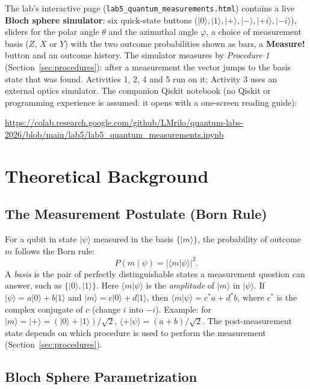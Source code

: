 \documentclass[a4paper,11pt]{article}
\providecommand{\ket}[1]{|{#1}\rangle}
\providecommand{\braket}[2]{\langle{#1}|{#2}\rangle}
\begin{document}
\begin{simulatorbox}
The lab's interactive page (\texttt{lab5\_quantum\_measurements.html}) contains a live
\textbf{Bloch sphere simulator}: six quick-state buttons ($\ket{0}, \ket{1}, \ket{+},
\ket{-}, \ket{+i}, \ket{-i}$), sliders for the polar angle $\theta$ and the azimuthal
angle $\varphi$, a choice of measurement basis ($Z$, $X$ or $Y$) with the two outcome
probabilities shown as bars, a \textbf{Measure!} button and an outcome history. The
simulator measures by \emph{Procedure 1} (Section~\ref{sec:procedures}): after a
measurement the vector jumps to the basis state that was found. Activities 1, 2, 4 and 5
run on it; Activity 3 uses an external optics simulator. The companion Qiskit notebook
(no Qiskit or programming experience is assumed: it opens with a one-screen reading
guide):\par\smallskip\noindent\url{https://colab.research.google.com/github/LMrilo/quantum-labs-2026/blob/main/lab5/lab5_quantum_measurements.ipynb}
\end{simulatorbox}

\section{Theoretical Background}

\subsection{The Measurement Postulate (Born Rule)}

For a qubit in state $\ket{\psi}$ measured in the basis $\{\ket{m}\}$, the probability
of outcome $m$ follows the Born rule:
\begin{equation}
    P(m \mid \psi) = |\braket{m}{\psi}|^2 .
    \label{eq:born}
\end{equation}
A \emph{basis} is the pair of perfectly distinguishable states a measurement question can
answer, such as $\{\ket{0}, \ket{1}\}$. Here $\braket{m}{\psi}$ is the \emph{amplitude}
of $\ket{m}$ in $\ket{\psi}$. If $\ket{\psi} = a\ket{0} + b\ket{1}$ and
$\ket{m} = c\ket{0} + d\ket{1}$, then $\braket{m}{\psi} = c^{*}a + d^{*}b$, where $c^{*}$
is the complex conjugate of $c$ (change $i$ into $-i$). Example: for
$\ket{m} = \ket{+} = (\ket{0} + \ket{1})/\sqrt 2$,
$\braket{+}{\psi} = (a + b)/\sqrt 2$. The post-measurement state depends on which
procedure is used to perform the measurement (Section~\ref{sec:procedures}).

\subsection{Bloch Sphere Parametrization}
\end{document}
